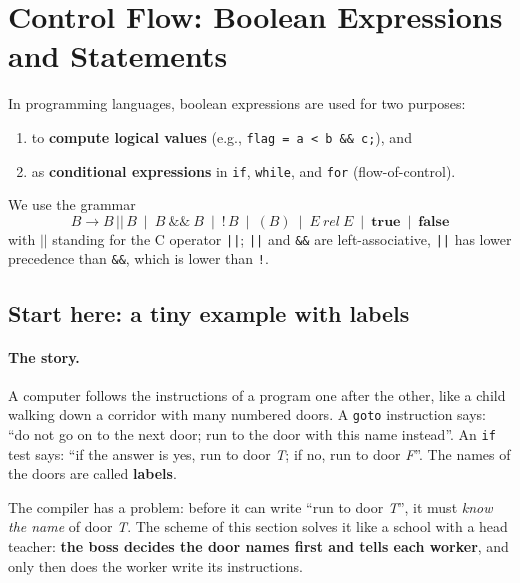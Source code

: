 \documentclass[11pt,a4paper]{article}
\begin{document}
\section{Control Flow: Boolean Expressions and Statements}

In programming languages, boolean expressions are used for two purposes:
\begin{enumerate}[nosep]
\item to \textbf{compute logical values} (e.g., \texttt{flag = a < b \&\& c;}), and
\item as \textbf{conditional expressions} in \texttt{if}, \texttt{while}, and \texttt{for} (flow-of-control).
\end{enumerate}
We use the grammar
\[
B \to B \,|\!|\, B \ \mid\ B\ \&\&\ B\ \mid\ !\,B\ \mid\ (B)\ \mid\ E\ \mathit{rel}\ E\ \mid\ \mathbf{true}\ \mid\ \mathbf{false}
\]
with $|\!|$ standing for the C operator \texttt{||}; \texttt{||} and \texttt{\&\&} are left-associative, \texttt{||} has lower precedence than \texttt{\&\&}, which is lower than \texttt{!}.

\subsection{Start here: a tiny example with labels}
\label{sec:labelintro}

\paragraph{The story.} A computer follows the instructions of a program one after the other, like a child walking down a corridor with many numbered doors. A \texttt{goto} instruction says: ``do not go on to the next door; run to the door with this name instead''. An \texttt{if} test says: ``if the answer is yes, run to door \emph{T}; if no, run to door \emph{F}''. The names of the doors are called \textbf{labels}.

The compiler has a problem: before it can write ``run to door \emph{T}'', it must \emph{know the name} of door \emph{T}. The scheme of this section solves it like a school with a head teacher: \textbf{the boss decides the door names first and tells each worker}, and only then does the worker write its instructions.
\end{document}
